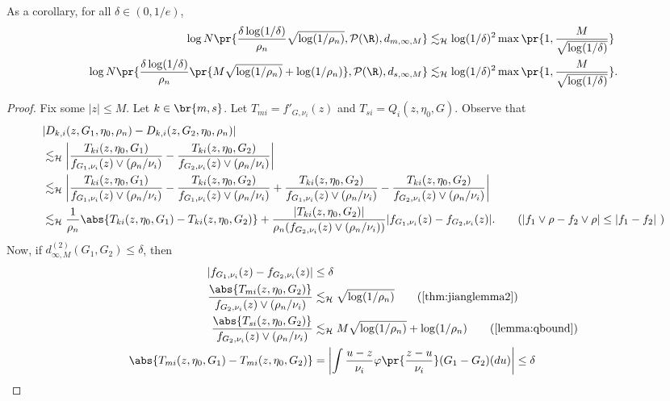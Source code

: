 \documentclass[12pt, reqno]{amsart}
\newcommand{\absauto}[1]{\left| #1 \right|}
\newcommand{\leH}{\lesssim_{\mathcal{H}}}
\numberwithin{equation}{section}
\begin{document}
\begin{refsection}
\begin{appendices}
\begin{prop}
As a corollary, for all $\delta \in (0, 1/e)$,
\begin{align*}
\log N\pr{\frac{\delta \log(1/\delta)}{\rho_n} \sqrt{\log (1/\rho_n)}, \mathcal P(\R), d_
{m,
\infty, M}} &\leH \log(1/\delta)^2 \max\pr{1, \frac{M}{\sqrt{\log(1/\delta)}}} \\
\log N\pr{\frac{\delta \log(1/\delta)}{\rho_n} \pr{M\sqrt{\log (1/\rho_n)} + \log
(1/\rho_n)},
\mathcal P(\R),
d_
{s,
\infty, M}} &\leH \log(1/\delta)^2 \max\pr{1, \frac{M}{\sqrt{\log(1/\delta)}}}.
\end{align*}
\end{prop}

\begin{proof}
Fix some $|z| \le M$. Let $k \in \br{m,s}$. Let $T_{mi} = f'_{G,\nu_i}(z)$ and $T_
{si} = Q_i(z, \eta_0, G)$. Observe that \begin{align*}
&|D_{k,i}(z, G_1, \eta_0, \rho_n) - D_{k,i}(z,G_2,\eta_0,\rho_n)| \\
&\leH \absauto{
  \frac{T_{ki}(z, \eta_0, G_1)}{f_{G_1, \nu_i}(z) \vee (\rho_n/\nu_i)}  - \frac{T_{ki}(z,
  \eta_0, G_2)}{f_{G_2, \nu_i}(z) \vee (\rho_n/\nu_i)} 
}\\
&\leH \absauto{
  \frac{T_{ki}(z, \eta_0, G_1)}{f_{G_1, \nu_i}(z) \vee (\rho_n/\nu_i)} - \frac{T_{ki}(z,
  \eta_0, G_2)}{f_{G_1, \nu_i}(z) \vee (\rho_n/\nu_i)} + \frac{T_{ki}(z, \eta_0, G_2)}{f_
  {G_1, \nu_i}(z) \vee (\rho_n/\nu_i)} - 
\frac{T_{ki}(z, \eta_0, G_2)}{f_{G_2, \nu_i}(z) \vee (\rho_n/\nu_i)}
}
\\
&\leH \frac{1}{\rho_n} \abs{
  T_{ki}(z, \eta_0, G_1) - T_{ki}(z, \eta_0, G_2)
} + \frac{|T_{ki}(z, \eta_0, G_2)| }{\rho_n (f_{G_2, \nu_i}(z) \vee (\rho_n/\nu_i))} |f_
{G_1,\nu_i} (z) - f_
{G_2,\nu_i} (z)|. 
\tag{$|f_1\vee \rho - f_2 \vee \rho| \le |f_1 - f_2|$ }
\end{align*}
Now, if $d^{(2)}_{\infty, M}(G_1, G_2) \le \delta$, then \begin{align*}
 |f_{G_1,\nu_i}(z) - f_{G_2,\nu_i}(z)| &\le \delta \\
\frac{\abs{T_{mi}(z, \eta_0, G_2)}}{f_{G_2,\nu_i}(z) \vee (\rho_n/\nu_i)} &\leH \sqrt{\log (1/\rho_n)} 
\tag{\cref{thm:jianglemma2}} \\
\frac{\abs{T_{si}(z, \eta_0, G_2)}}{f_{G_2,\nu_i}(z) \vee (\rho_n/\nu_i)} &\leH M\sqrt{\log (1/\rho_n)} +
\log(1/\rho_n) \tag{\cref{lemma:qbound}} \\ 
\abs{T_{mi}(z, \eta_0, G_1) - T_{mi}(z, \eta_0, G_2)} &= \absauto{
  \int \frac{u-z}{\nu_i} \varphi\pr{\frac{z-u}{\nu_i}} (G_1 - G_2)(du)
}  \le \delta \\

\end{align*}
\end{proof}
\end{appendices}
\end{refsection}
\end{document}

